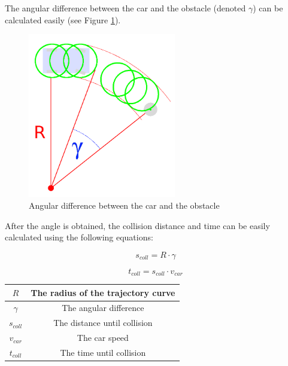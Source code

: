 The angular difference between the car and the obstacle (denoted $\gamma$) can be calculated easily (see Figure \ref{static_collision_time_check_angle}).

\begin{figure}[!ht]
    \centering
    \includegraphics[height=72mm]{figures/raw/static_collision_time_check_angle.png}
    \caption{Angular difference between the car and the obstacle}
    \label{static_collision_time_check_angle}
\end{figure}

After the angle is obtained, the collision distance and time can be easily calculated using the following equations:

\begin{equation}\label{eq:collision_dist}
s_{coll} = R \cdot \gamma
\end{equation}

\begin{equation}\label{eq:collision_time}
t_{coll} = s_{coll} \cdot v_{car}
\end{equation}

\begin{center}
    \begin{tabular}{ | c | c | }
        \hline
        $R$         & The radius of the trajectory curve    \\
        \hline
        $\gamma$    & The angular difference                \\
        \hline
        $s_{coll}$  & The distance until collision          \\
        \hline
        $v_{car}$   & The car speed                         \\
        \hline 
        $t_{coll}$  & The time until collision              \\
        \hline
    \end{tabular}
\end{center}

